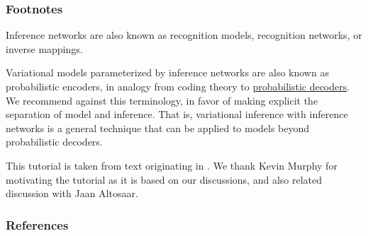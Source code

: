 \subsubsection{Footnotes}

Inference networks are also known as recognition models, recognition
networks, or inverse mappings.

Variational models parameterized by
inference networks are also known as probabilistic encoders, in
analogy from coding theory to
\href{/tutorials/decoder}{probabilistic decoders}.
We recommend against this terminology,
in favor of making explicit the separation of model and inference.
That is,
variational inference with inference networks is a
general technique that can be applied to models beyond
probabilistic decoders.

This tutorial is taken from text originating in \citet{tran2016variational}.
We thank Kevin Murphy for motivating the tutorial as it is based
on our discussions, and also related discussion with Jaan Altosaar.

\subsubsection{References}\label{references}

